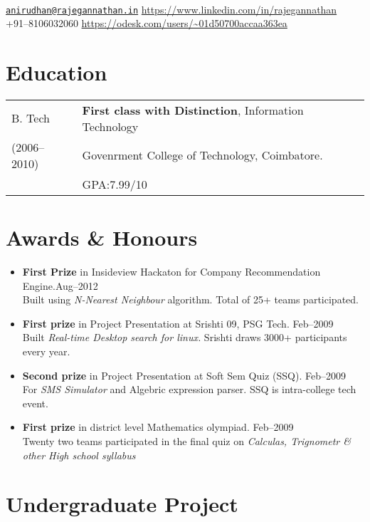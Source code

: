 \documentclass{resume}
\begin{document}
\\
{\href{mailto:anirudhan@rajegannathan.in}{\nolinkurl{anirudhan@rajegannathan.in}} \hfill \url{https://www.linkedin.com/in/rajegannathan}}\\
{+91--8106032060 \hfill \url{https://odesk.com/users/~01d50700accaa363ea}}

\section{Education}
\begin{tabular}{>{\centering\arraybackslash}p{1in}l}
  B. Tech & \textbf{First class with Distinction}, Information Technology\\
  \small{(2006--2010)} & Govenrment College of Technology, Coimbatore.\\
    & GPA:\@ 7.99/10
\end{tabular}

\section{Awards \& Honours}
  \begin{itemize}[label={$\ast$}]
    \item \textbf{First Prize} in Insideview Hackaton for Company Recommendation Engine.\hfill Aug--2012\\
      \small{Built using \textit{N-Nearest Neighbour} algorithm.  Total of 25+ teams participated.}
    \item \textbf{First prize} in Project Presentation at Srishti 09, PSG Tech. \hfill Feb--2009\\
      \small{Built \textit{Real-time Desktop search for linux.} Srishti draws 3000+ participants every year.}
    \item \textbf{Second prize} in Project Presentation at Soft Sem Quiz (SSQ). \hfill Feb--2009\\
      \small{For \textit{SMS Simulator} and Algebric expression parser. SSQ is intra-college tech event.}
    \item \textbf{First prize} in district level Mathematics olympiad. \hfill Feb--2009\\
      \small{Twenty two teams participated in the final quiz on \textit{Calculas, Trignometr \& other High school syllabus}}
  \end{itemize}

\section{Undergraduate Project}
\end{document}
